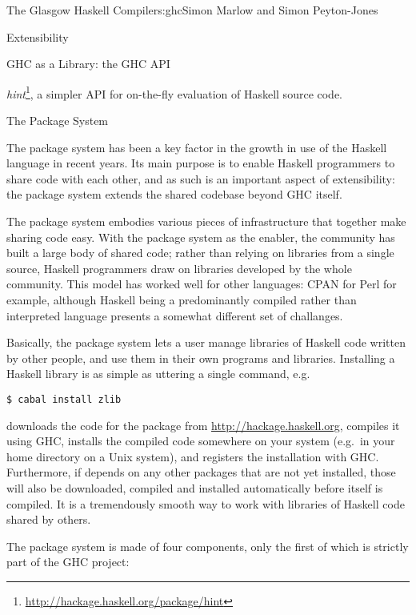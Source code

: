 \begin{aosachapter}{The Glasgow Haskell Compiler}{s:ghc}{Simon Marlow and Simon Peyton-Jones}
\begin{aosasect1}{Extensibility}
\begin{aosasect2}{GHC as a Library: the GHC API}
\begin{aosaitemize}
\item
  \emph{hint}\footnote{\url{http://hackage.haskell.org/package/hint}},
  a simpler API for on-the-fly evaluation of Haskell source code.

\end{aosaitemize}

\end{aosasect2}

\begin{aosasect2}{The Package System}

The package system has been a key factor in the growth in use of the
Haskell language in recent years.  Its main purpose is to enable
Haskell programmers to share code with each other, and as such is an
important aspect of extensibility: the package system extends the
shared codebase beyond GHC itself.

The package system embodies various pieces of infrastructure that
together make sharing code easy.  With the package system as the
enabler, the community has built a large body of shared code; rather
than relying on libraries from a single source, Haskell programmers
draw on libraries developed by the whole community.  This model has
worked well for other languages: CPAN for Perl for example, although
Haskell being a predominantly compiled rather than interpreted
language presents a somewhat different set of challanges.

Basically, the package system lets a user manage libraries of Haskell
code written by other people, and use them in their own programs and
libraries.  Installing a Haskell library is as simple as uttering a
single command, e.g.

\begin{verbatim}
$ cabal install zlib
\end{verbatim}

\noindent
downloads the code for the  package from
\url{http://hackage.haskell.org}, compiles it using GHC, installs the
compiled code somewhere on your system (e.g.\ in your home directory
on a Unix system), and registers the installation with GHC.
Furthermore, if  depends on any other packages that are not
yet installed, those will also be downloaded, compiled and installed
automatically before  itself is compiled.  It is a
tremendously smooth way to work with libraries of Haskell code shared
by others.

The package system is made of four components, only the first of which
is strictly part of the GHC project:


\end{aosasect2}
\end{aosasect1}
\end{aosachapter}
